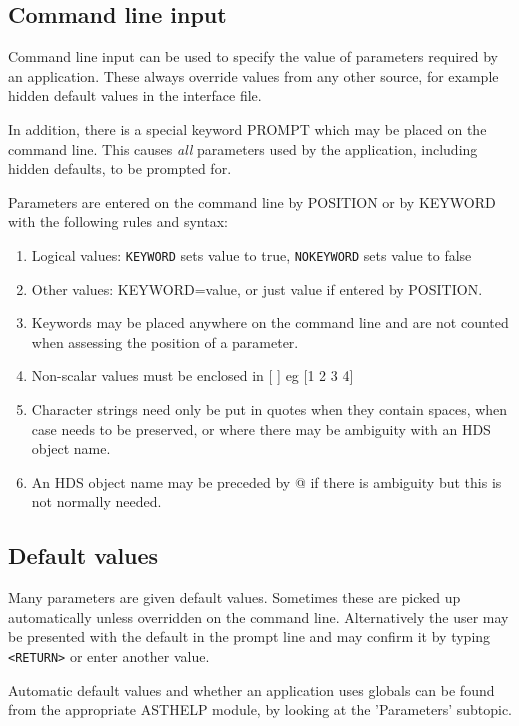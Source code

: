 \documentclass{book}
\renewcommand{\_}{{\tt\char'137}}     %
\begin{document}
\subsection{Command line input}
Command line input can be used to specify the value of parameters
required by an application. These always override values from any
other source, for example hidden default values in the interface
file.

In addition, there is a special keyword PROMPT which may be
placed on the command line. This causes {\em all} parameters used by
the application, including hidden defaults, to be prompted for.

Parameters are entered on the command line by POSITION or by
KEYWORD with the following rules and syntax:


\begin{enumerate}
\item Logical values: {\tt KEYWORD} sets value to true,
{\tt NOKEYWORD} sets value to false

\item Other values: KEYWORD=value,
or just value if entered by POSITION.

\item Keywords may be placed anywhere on the command line
and are not counted when assessing the position of a
parameter.

\item Non-scalar values must be enclosed in [ ] eg [1 2 3 4]

\item Character strings need only be put in quotes when
they contain spaces, when case needs to be preserved, or
where there may be ambiguity with an HDS object name.

\item An HDS object name may be preceded by @ if there is
ambiguity but this is not normally needed.

\end{enumerate}
\subsection{Default values}
Many parameters are given default values. Sometimes these are
picked up automatically unless overridden on the command line.
Alternatively the user may be presented with the default in the
prompt line and may confirm it by typing \verb+<RETURN>+ or enter
another value.

Automatic default values and whether an application uses globals
can be found from the appropriate ASTHELP module, by looking at
the 'Parameters' subtopic.
\end{document}

